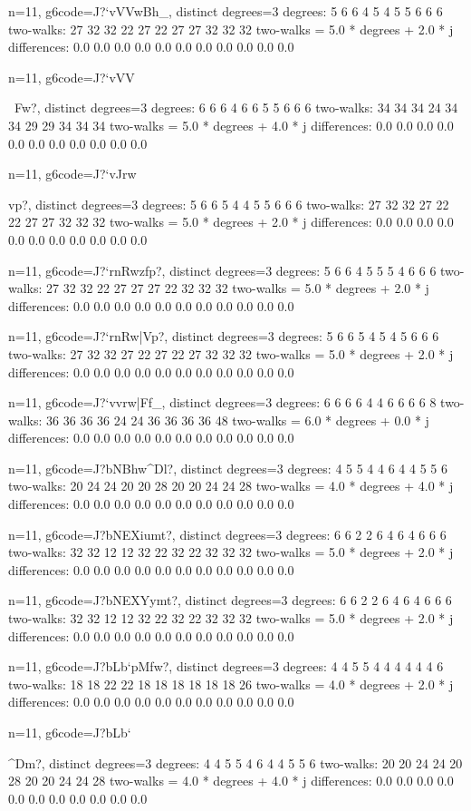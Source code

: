 {{{{{{{{{{{{{{{{{{{n=11, g6code=J?`vVVw}Bh_, distinct degrees=3
degrees: 5 6 6 4 5 4 5 5 6 6 6 
two-walks: 27 32 32 22 27 22 27 27 32 32 32 
two-walks = 5.0 * degrees + 2.0 * j
differences: 0.0 0.0 0.0 0.0 0.0 0.0 0.0 0.0 0.0 0.0 0.0 

n=11, g6code=J?`vVV{~Fw?, distinct degrees=3
degrees: 6 6 6 4 6 6 5 5 6 6 6 
two-walks: 34 34 34 24 34 34 29 29 34 34 34 
two-walks = 5.0 * degrees + 4.0 * j
differences: 0.0 0.0 0.0 0.0 0.0 0.0 0.0 0.0 0.0 0.0 0.0 

n=11, g6code=J?`vJrw{vp?, distinct degrees=3
degrees: 5 6 6 5 4 4 5 5 6 6 6 
two-walks: 27 32 32 27 22 22 27 27 32 32 32 
two-walks = 5.0 * degrees + 2.0 * j
differences: 0.0 0.0 0.0 0.0 0.0 0.0 0.0 0.0 0.0 0.0 0.0 

n=11, g6code=J?`rnRwzfp?, distinct degrees=3
degrees: 5 6 6 4 5 5 5 4 6 6 6 
two-walks: 27 32 32 22 27 27 27 22 32 32 32 
two-walks = 5.0 * degrees + 2.0 * j
differences: 0.0 0.0 0.0 0.0 0.0 0.0 0.0 0.0 0.0 0.0 0.0 

n=11, g6code=J?`rnRw|Vp?, distinct degrees=3
degrees: 5 6 6 5 4 5 4 5 6 6 6 
two-walks: 27 32 32 27 22 27 22 27 32 32 32 
two-walks = 5.0 * degrees + 2.0 * j
differences: 0.0 0.0 0.0 0.0 0.0 0.0 0.0 0.0 0.0 0.0 0.0 

n=11, g6code=J?`vvrw|Ff_, distinct degrees=3
degrees: 6 6 6 6 4 4 6 6 6 6 8 
two-walks: 36 36 36 36 24 24 36 36 36 36 48 
two-walks = 6.0 * degrees + 0.0 * j
differences: 0.0 0.0 0.0 0.0 0.0 0.0 0.0 0.0 0.0 0.0 0.0 

n=11, g6code=J?bNBhw^Dl?, distinct degrees=3
degrees: 4 5 5 4 4 6 4 4 5 5 6 
two-walks: 20 24 24 20 20 28 20 20 24 24 28 
two-walks = 4.0 * degrees + 4.0 * j
differences: 0.0 0.0 0.0 0.0 0.0 0.0 0.0 0.0 0.0 0.0 0.0 

n=11, g6code=J?bNEXiumt?, distinct degrees=3
degrees: 6 6 2 2 6 4 6 4 6 6 6 
two-walks: 32 32 12 12 32 22 32 22 32 32 32 
two-walks = 5.0 * degrees + 2.0 * j
differences: 0.0 0.0 0.0 0.0 0.0 0.0 0.0 0.0 0.0 0.0 0.0 

n=11, g6code=J?bNEXYymt?, distinct degrees=3
degrees: 6 6 2 2 6 4 6 4 6 6 6 
two-walks: 32 32 12 12 32 22 32 22 32 32 32 
two-walks = 5.0 * degrees + 2.0 * j
differences: 0.0 0.0 0.0 0.0 0.0 0.0 0.0 0.0 0.0 0.0 0.0 

n=11, g6code=J?bLb`pMfw?, distinct degrees=3
degrees: 4 4 5 5 4 4 4 4 4 4 6 
two-walks: 18 18 22 22 18 18 18 18 18 18 26 
two-walks = 4.0 * degrees + 2.0 * j
differences: 0.0 0.0 0.0 0.0 0.0 0.0 0.0 0.0 0.0 0.0 0.0 

n=11, g6code=J?bLb`{^Dm?, distinct degrees=3
degrees: 4 4 5 5 4 6 4 4 5 5 6 
two-walks: 20 20 24 24 20 28 20 20 24 24 28 
two-walks = 4.0 * degrees + 4.0 * j
differences: 0.0 0.0 0.0 0.0 0.0 0.0 0.0 0.0 0.0 0.0 0.0 

}}}}}}}}}}}}}}}}}}}}}

